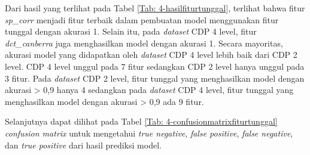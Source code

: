 Dari hasil yang terlihat pada Tabel \ref{Tab: 4-hasilfiturtunggal}, terlihat bahwa fitur \emph{sp\_corr} menjadi fitur terbaik dalam pembuatan model
menggunakan fitur tunggal dengan akurasi 1. Selain itu, pada \emph{dataset} CDP 4 level, fitur \emph{dct\_canberra} juga menghasilkan model dengan akurasi 1.
Secara mayoritas, akurasi model yang didapatkan oleh \emph{dataset} CDP 4 level lebih baik dari CDP 2 level. CDP 4 level unggul pada 7 fitur sedangkan CDP 2
level hanya unggul pada 3 fitur. Pada \emph{dataset} CDP 2 level, fitur tunggal yang menghasilkan model dengan akurasi > 0,9 hanya 4 sedangkan pada
\emph{dataset} CDP 4 level, fitur tunggal yang menghasilkan model dengan akurasi > 0,9 ada 9 fitur.

Selanjutnya dapat dilihat pada Tabel \ref{Tab: 4-confusionmatrixfiturtunggal} \emph{confusion matrix} untuk mengetahui \emph{true negative}, \emph{false
	positive}, \emph{false negative}, dan \emph{true positive} dari hasil prediksi model.


